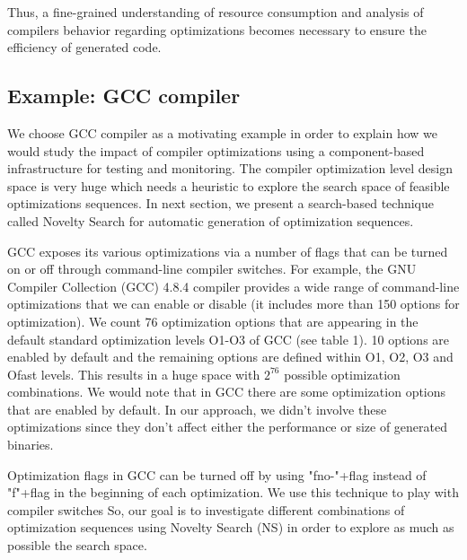 Thus, a fine-grained understanding of resource
consumption and analysis of compilers behavior regarding
optimizations becomes necessary to ensure the efficiency of generated code.

\subsection{Example: GCC compiler}
We choose GCC compiler as a motivating example in order to explain how we would study the impact of compiler optimizations using a component-based infrastructure for testing and monitoring.
The compiler optimization level design space is very huge which needs a heuristic to explore the search space of feasible optimizations sequences. In next section, we present a search-based technique called Novelty Search for automatic generation of optimization sequences. 

GCC exposes its various optimizations via a number of flags that can be turned on or off through command-line compiler switches. For example, the GNU Compiler Collection (GCC) 4.8.4 compiler provides a wide range of command-line optimizations that we can enable or disable (it includes more than 150 options for optimization). We count 76 optimization options that are appearing in the default standard optimization levels O1-O3 of GCC (see table 1). 10 options are enabled by default and the remaining options are defined within O1, O2, O3 and Ofast levels.
This results in a huge space with $2^{76}$ possible optimization
combinations.
We would note that in GCC there are some optimization options that are enabled by default. In our approach, we didn't involve these optimizations since they don't affect either the performance or size of generated binaries.

Optimization flags in GCC can be turned off by using "fno-"+flag instead of "f"+flag in the beginning of each optimization. We use this technique to play with compiler switches
So, our goal is to investigate different combinations of optimization sequences using Novelty Search (NS) in order to explore as much as possible the search space. 

